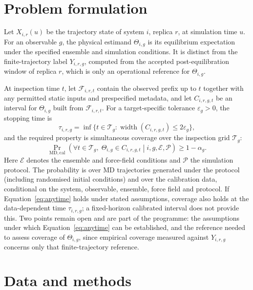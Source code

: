 \documentclass[11pt]{article}
\begin{document}
\section{Problem formulation}\label{sec:problem}

Let $X_{i,r}(u)$ be the trajectory state of system $i$, replica $r$, at simulation time $u$. For an observable $g$, the physical estimand $\Theta_{i,g}$ is its equilibrium expectation under the specified ensemble and simulation conditions. It is distinct from the finite-trajectory label $Y_{i,r,g}$, computed from the accepted post-equilibration window of replica $r$, which is only an operational reference for $\Theta_{i,g}$.

At inspection time $t$, let $\mathcal{F}_{i,r,t}$ contain the observed prefix up to $t$ together with any permitted static inputs and prespecified metadata, and let $C_{i,r,g,t}$ be an interval for $\Theta_{i,g}$ built from $\mathcal{F}_{i,r,t}$. For a target-specific tolerance $\varepsilon_g>0$, the stopping time is
\[
  \tau_{i,r,g}=\inf\{t\in\mathcal{T}_g: \operatorname{width}(C_{i,r,g,t})\leq 2\varepsilon_g\},
\]
and the required property is simultaneous coverage over the inspection grid $\mathcal{T}_g$:
\begin{equation}
  \Pr_{\mathrm{MD,cal}}\!\left(\forall t\in\mathcal{T}_g,\;\Theta_{i,g}\in C_{i,r,g,t}
  \middle| i,g,\mathcal{E},\mathcal{P}\right)\geq 1-\alpha_g.
  \label{eq:anytime}
\end{equation}
Here $\mathcal{E}$ denotes the ensemble and force-field conditions and $\mathcal{P}$ the simulation protocol. The probability is over MD trajectories generated under the protocol (including randomised initial conditions) and over the calibration data, conditional on the system, observable, ensemble, force field and protocol. If Equation~\eqref{eq:anytime} holds under stated assumptions, coverage also holds at the data-dependent time $\tau_{i,r,g}$; a fixed-horizon calibrated interval does not provide this. Two points remain open and are part of the programme: the assumptions under which Equation~\eqref{eq:anytime} can be established, and the reference needed to assess coverage of $\Theta_{i,g}$, since empirical coverage measured against $Y_{i,r,g}$ concerns only that finite-trajectory reference.

\section{Data and methods}\label{sec:methods}
\end{document}
